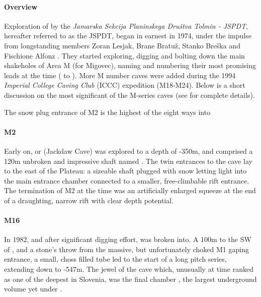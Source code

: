 \paragraph{Overview} Exploration of  by the \textit{Jamarska Sekcija Planinskega Društva Tolmin - JSPDT}, hereafter referred to as the JSPDT, began in earnest in 1974, under the impulse from longstanding members Zoran Lesjak, Brane Bratuž, Stanko Breška and Fischione Alfonz \citep{hm1}. They started exploring, digging and bolting down the main shakeholes of Area M (for Migovec), naming and numbering their most promising leads at the time ( to ). More M number caves were added during the 1994 \textit{Imperial College Caving Club} (ICCC) expedition (M18-M24). Below is a short discussion on the most significant of the M-series caves (see \citet{hm1} for complete details). 

\begin{marginfigure}
\checkoddpage \ifoddpage \forcerectofloat \else \forceversofloat \fi
\centering
 \caption{The snow plug entrance of M2 is the highest of the eight ways into \protect{} }
 \label{surfaceM2}
\end{marginfigure}

\paragraph{M2} Early on,  or  (Jackdaw Cave) was explored to a depth of -350m, and comprised a 120m unbroken and impressive shaft named . The twin entrances to the cave lay to the east of the Plateau: a sizeable shaft plugged with snow letting light into the main entrance chamber connected to a smaller, free-climbable rift entrance. The termination of M2 at the time was an artificially enlarged squeeze at the end of a draughting, narrow rift with clear depth potential.

\paragraph{M16} In 1982, and after significant digging effort,  was broken into. A 100m to the SW of , and a stone's throw from the massive, but unfortunately choked M1 gaping entrance, a small, choss filled tube led to the start of a long pitch series, extending down to -547m. The jewel of the cave which, unusually at time ranked as one of the deepest in Slovenia, was the final chamber , the largest underground volume yet under . 

